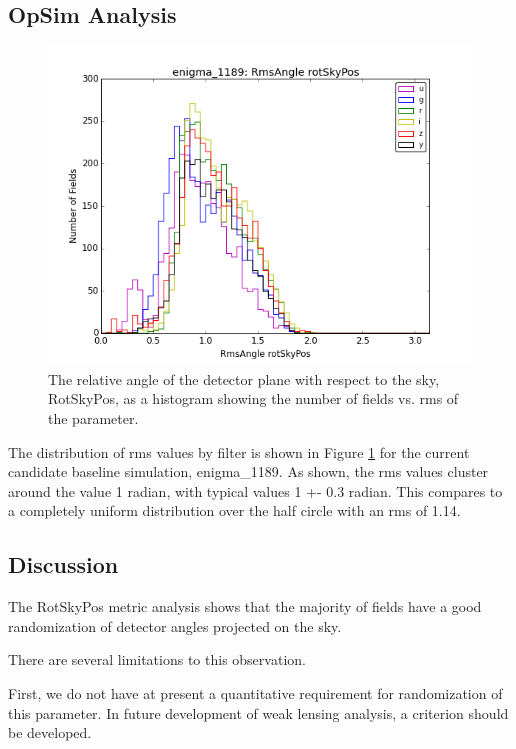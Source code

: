 \subsection{OpSim Analysis}

\begin{figure}
\includegraphics[width=5.0in]{enigma1189RmsAnglerotSkyPosugrizybandallpropsOPSIComboHistogram.png}
\caption{The relative angle of the detector plane with respect to the sky, RotSkyPos, as a histogram showing the number of fields vs. rms of the parameter.}
\label{RotSkyPos}
\end{figure}

The distribution of rms values by filter is shown in Figure
\ref{RotSkyPos} for the current candidate baseline simulation,
enigma\_1189.  As shown, the rms values cluster around the value 1
radian,  with typical values 1 +- 0.3 radian.  This compares to a
completely uniform distribution over the half circle with an rms of
1.14.

\subsection{Discussion}

The RotSkyPos metric analysis shows that the majority of fields have a
good randomization of detector angles projected on the sky.

There are several limitations to this observation.

First, we do not have at present a quantitative requirement for
randomization of this parameter.  In future development of weak
lensing analysis, a criterion should be developed.

